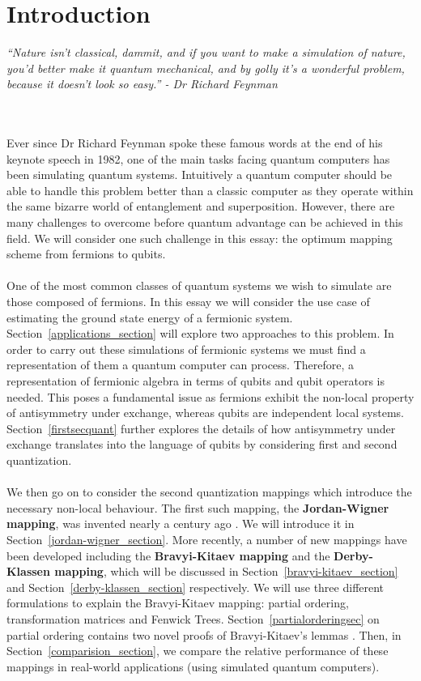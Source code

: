 \documentclass[twoside]{article}
\begin{document}
\section{Introduction}
\begin{center} \it ``Nature isn't classical, dammit, and if you want to make a simulation of nature, you'd better make it quantum mechanical, and by golly it's a wonderful problem, because it doesn't look so easy.'' - {\sl Dr Richard Feynman \cite{feynmann}}\end{center}  \\\\
Ever since Dr Richard Feynman spoke these famous words at the end of his keynote speech in 1982, one of the main tasks facing quantum computers has been simulating quantum systems. Intuitively a quantum computer should be able to handle this problem better than a classic computer as they operate within the same bizarre world of entanglement and superposition. However, there are many challenges to overcome before quantum advantage can be achieved in this field. We will consider one such challenge in this essay: the optimum mapping scheme from fermions to qubits.\\\\
One of the most common classes of quantum systems we wish to simulate are those composed of fermions. In this essay we will consider the use case of estimating the ground state energy of a fermionic system. Section~\ref{applications_section} will explore two approaches to this problem. In order to carry out these simulations of fermionic systems we must find a representation of them a quantum computer can process. Therefore, a representation of fermionic algebra in terms of qubits and qubit operators is needed. This poses a fundamental issue as fermions exhibit the non-local property of antisymmetry under exchange, whereas qubits are independent local systems. Section~\ref{firstsecquant} further explores the details of how antisymmetry under exchange translates into the language of qubits by considering first and second quantization. \\\\
We then go on to consider the second quantization mappings which introduce the necessary non-local behaviour. The first such mapping, the \textbf{Jordan-Wigner mapping}, was invented nearly a century ago \cite{originalJordanWigner}. We will introduce it in Section~\ref{jordan-wigner_section}. More recently, a number of new mappings have been developed including the \textbf{Bravyi-Kitaev mapping} and the \textbf{Derby-Klassen mapping}, which will be discussed in Section~\ref{bravyi-kitaev_section} and Section~\ref{derby-klassen_section} respectively. We will use three different formulations to explain the Bravyi-Kitaev mapping: partial ordering, transformation matrices and Fenwick Trees. Section~\ref{partialorderingsec} on partial ordering contains two novel proofs of Bravyi-Kitaev's lemmas \cite{bravyikitaev}. Then, in Section~\ref{comparision_section}, we compare the relative performance of these mappings in real-world applications (using simulated quantum computers).
\end{document}
